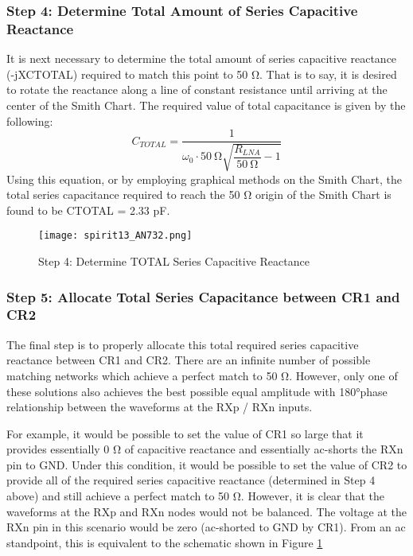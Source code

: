       \subsubsection{Step 4: Determine Total Amount of Series Capacitive Reactance}
        It is next necessary to determine the total amount of series capacitive reactance 
        (-jXCTOTAL) required to match this point to 50 Ω. That is to say, it is desired to rotate 
        the reactance along a line of constant resistance until arriving at the center of the Smith 
        Chart. The required value of total capacitance is given by the following:
        \begin{equation}\label{EXP001:eq_spirit15}
          C_{TOTAL} = \frac{1}{\omega_0\cdot\SI{50}{\ohm}\sqrt{\dfrac{R_{LNA}}{\SI{50}{\ohm}}-1}}
        \end{equation}
        Using this equation, or by employing graphical methods on the Smith Chart, the total series 
        capacitance required to reach the 50 Ω origin of the Smith Chart is found to be CTOTAL = 2.33 pF.
        
        \begin{figure}[ht!] %
          \centering
          \texttt{[image: spirit13\_AN732.png]}
          \caption{Step 4: Determine TOTAL Series Capacitive Reactance \cite[s.~8]{AN643SiliconLabs}}
          \label{EXP001:fig_spirit13}
        \end{figure}
        
      \subsubsection{Step 5: Allocate Total Series Capacitance between CR1 and CR2}
        The final step is to properly allocate this total required series capacitive reactance 
        between CR1 and CR2. There are an infinite number of possible matching networks which 
        achieve a perfect match to 50 Ω. However, only one of these solutions also achieves the 
        best possible equal amplitude with 180°phase relationship between the waveforms at the RXp 
        / RXn inputs.
        
        For example, it would be possible to set the value of CR1 so large that it provides 
        essentially 0 Ω of capacitive reactance and essentially ac-shorts the RXn pin to GND. Under 
        this condition, it would be possible to set the value of CR2 to provide all of the required 
        series capacitive reactance (determined in Step 4 above) and still achieve a perfect match 
        to 50 Ω. However, it is clear that the waveforms at the RXp and RXn nodes would not be 
        balanced. The voltage at the RXn pin in this scenario would be zero (ac-shorted to GND by 
        CR1). From an ac standpoint, this is equivalent to the schematic shown in Figure 
        \ref{EXP001:fig_spirit13}
        
